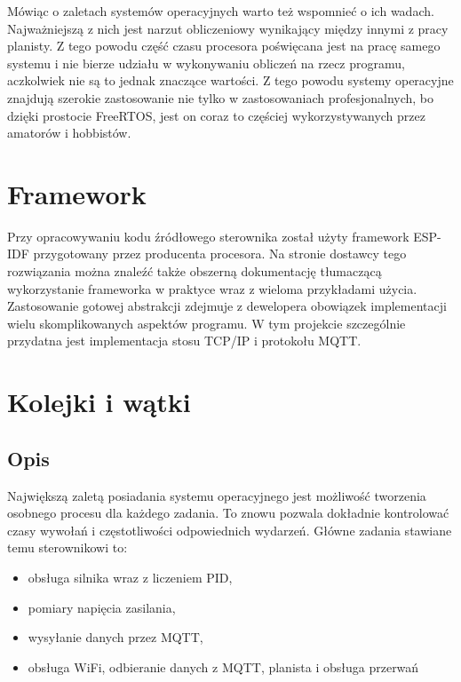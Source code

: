             \vspace{1em}
            
            Mówiąc o zaletach systemów operacyjnych warto też wspomnieć o ich wadach. Najważniejszą z nich jest narzut obliczeniowy wynikający między innymi z pracy planisty. Z tego powodu część czasu procesora poświęcana jest na pracę samego systemu i nie bierze udziału w wykonywaniu obliczeń na rzecz programu, aczkolwiek nie są to jednak znaczące wartości. Z tego powodu systemy operacyjne znajdują szerokie zastosowanie nie tylko w zastosowaniach profesjonalnych, bo dzięki prostocie FreeRTOS, jest on coraz to częściej wykorzystywanych przez amatorów i hobbistów.
      
            
        \section{Framework}
            Przy opracowywaniu kodu źródłowego sterownika został użyty framework ESP-IDF \cite{esp-idf} przygotowany przez producenta procesora. Na stronie dostawcy tego rozwiązania można znaleźć także obszerną dokumentację tłumaczącą wykorzystanie frameworka w praktyce wraz z wieloma przykładami użycia. Zastosowanie gotowej abstrakcji zdejmuje z dewelopera obowiązek implementacji wielu skomplikowanych aspektów programu. W tym projekcie szczególnie przydatna jest implementacja stosu TCP/IP i protokołu MQTT.
    
    
        \section{Kolejki i wątki}
            \subsection{Opis}
            Największą zaletą posiadania systemu operacyjnego jest możliwość tworzenia osobnego procesu dla każdego zadania. To znowu pozwala dokładnie kontrolować czasy wywołań i częstotliwości odpowiednich wydarzeń. Główne zadania stawiane temu sterownikowi to:
            
            \begin{itemize}
                \item obsługa silnika wraz z liczeniem PID,
                \item pomiary napięcia zasilania,
                \item wysyłanie danych przez MQTT,
                \item obsługa WiFi, odbieranie danych z MQTT, planista i obsługa przerwań
            \end{itemize}
            

